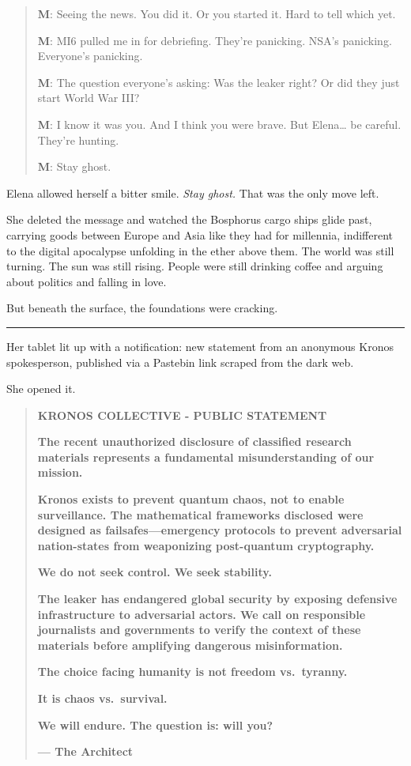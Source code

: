 \begin{quote}
\textbf{M}: Seeing the news. You did it. Or you started it. Hard to tell which yet.

\textbf{M}: MI6 pulled me in for debriefing. They're panicking. NSA's panicking. Everyone's panicking.

\textbf{M}: The question everyone's asking: Was the leaker right? Or did they just start World War III?

\textbf{M}: I know it was you. And I think you were brave. But Elena\ldots{} be careful. They're hunting.

\textbf{M}: Stay ghost.
\end{quote}

Elena allowed herself a bitter smile. \emph{Stay ghost.} That was the only move left.

She deleted the message and watched the Bosphorus cargo ships glide past, carrying goods between Europe and Asia like they had for millennia, indifferent to the digital apocalypse unfolding in the ether above them. The world was still turning. The sun was still rising. People were still drinking coffee and arguing about politics and falling in love.

But beneath the surface, the foundations were cracking.

\begin{center}\rule{0.5\linewidth}{0.5pt}\end{center}

Her tablet lit up with a notification: new statement from an anonymous Kronos spokesperson, published via a Pastebin link scraped from the dark web.

She opened it.

\begin{quote}
\textbf{KRONOS COLLECTIVE - PUBLIC STATEMENT}

\textbf{The recent unauthorized disclosure of classified research materials represents a fundamental misunderstanding of our mission.}

\textbf{Kronos exists to prevent quantum chaos, not to enable surveillance. The mathematical frameworks disclosed were designed as failsafes---emergency protocols to prevent adversarial nation-states from weaponizing post-quantum cryptography.}

\textbf{We do not seek control. We seek stability.}

\textbf{The leaker has endangered global security by exposing defensive infrastructure to adversarial actors. We call on responsible journalists and governments to verify the context of these materials before amplifying dangerous misinformation.}

\textbf{The choice facing humanity is not freedom vs.~tyranny.}

\textbf{It is chaos vs.~survival.}

\textbf{We will endure. The question is: will you?}

\textbf{--- The Architect}
\end{quote}

